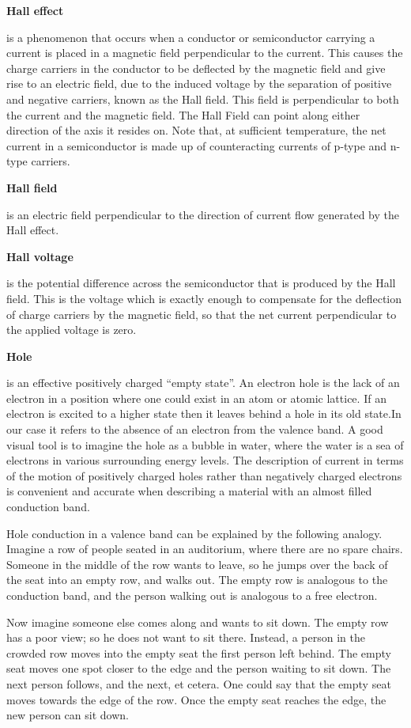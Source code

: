 \documentclass{../lab}
\begin{document}
\textbf{Hall effect}

is a phenomenon that occurs when a conductor or semiconductor carrying a current is placed in a magnetic field perpendicular to the current. This causes the charge carriers in the conductor to be deflected by the magnetic field and give rise to an electric field, due to the induced voltage by the separation of positive and negative carriers, known as the Hall field. This field is perpendicular to both the current and the magnetic field. The Hall Field can point along either direction of the axis it resides on. Note that, at sufficient temperature, the net current in a semiconductor is made up of counteracting currents of p-type and n-type carriers.

\textbf{Hall field}

is an electric field perpendicular to the direction of current flow generated by the Hall effect.

\textbf{Hall voltage}

is the potential difference across the semiconductor that is produced by the Hall field. This is the voltage which is exactly enough to compensate for the deflection of charge carriers by the magnetic field, so that the net current perpendicular to the applied voltage is zero.

\textbf{Hole}

is an effective positively charged ``empty state''. An electron hole is the lack of an electron in a position where one could exist in an atom or atomic lattice. If an electron is excited to a higher state then it leaves behind a hole in its old state.In our case it refers to the absence of an electron from the valence band. A good visual tool is to imagine the hole as a bubble in water, where the water is a sea of electrons in various surrounding energy levels. The description of current in terms of the motion of positively charged holes rather than negatively charged electrons is convenient and accurate when describing a material with an almost filled conduction band.

Hole conduction in a valence band can be explained by the following analogy. Imagine a row of people seated in an auditorium, where there are no spare chairs. Someone in the middle of the row wants to leave, so he jumps over the back of the seat into an empty row, and walks out. The empty row is analogous to the conduction band, and the person walking out is analogous to a free electron.

Now imagine someone else comes along and wants to sit down. The empty row has a poor view; so he does not want to sit there. Instead, a person in the crowded row moves into the empty seat the first person left behind. The empty seat moves one spot closer to the edge and the person waiting to sit down. The next person follows, and the next, et cetera. One could say that the empty seat moves towards the edge of the row. Once the empty seat reaches the edge, the new person can sit down.
\end{document}
